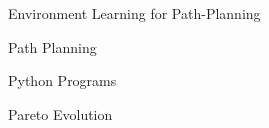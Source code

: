 \documentclass[aspectratio=169]{beamer}
\makeatletter
\renewcommand{\emphasis}[1]{{\Huge \color{pureminimalistic@text@red} #1}}
\newcommand{\cb}[1]{{\color{c2} #1}}
\newcommand{\cc}[1]{{\color{c3} #1}}
\newcommand{\ce}[1]{{\color{c4} #1}}
\makeatother
\begin{document}
\begin{frame}{Environment Learning for Path-Planning}
    \begin{vfilleditems}
        \item \cb{\Huge Path Planning}
        \vspace{0.7em}
        \item \cc{\Huge Python Programs}
        \vspace{0.7em}
        \item \ce{\Huge Pareto Evolution}
    \end{vfilleditems}
\end{frame}

%   
\end{document}
